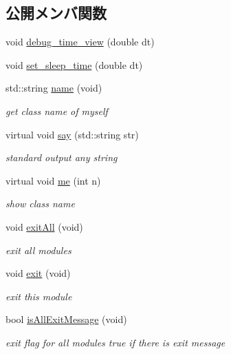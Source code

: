 \subsection*{公開メンバ関数}
\begin{DoxyCompactItemize}
\item 
void \hyperlink{classfractal_1_1Module_aa1799cce209611e46fafb8e826f4dc2e}{debug\+\_\+time\+\_\+view} (double dt)
\item 
void \hyperlink{classfractal_1_1Module_a4cd49e1c42043ea4254a8859992f5a64}{set\+\_\+sleep\+\_\+time} (double dt)
\item 
std\+::string \hyperlink{classfractal_1_1Module_a770fab9c6a6f310e76a9c29ed9c7d515}{name} (void)
\begin{DoxyCompactList}\small\item\em get class name of myself \end{DoxyCompactList}\item 
virtual void \hyperlink{classfractal_1_1Module_afd605b7a7ef55d5d0a55f520ff8feb86}{say} (std\+::string str)
\begin{DoxyCompactList}\small\item\em standard output any string \end{DoxyCompactList}\item 
virtual void \hyperlink{classfractal_1_1Module_a92deaafb88a2bc34958dca99fdc112a3}{me} (int n)
\begin{DoxyCompactList}\small\item\em show class name \end{DoxyCompactList}\item 
void \hyperlink{classfractal_1_1Module_a40cfc2e5ab9829d5decaef0ce30cdbcc}{exit\+All} (void)
\begin{DoxyCompactList}\small\item\em exit all modules \end{DoxyCompactList}\item 
void \hyperlink{classfractal_1_1Module_a04ba8c14e82f92c1db411662d7a16cd8}{exit} (void)
\begin{DoxyCompactList}\small\item\em exit this module \end{DoxyCompactList}\item 
bool \hyperlink{classfractal_1_1Module_a7766711ae2e854ee7a723781ef1b2572}{is\+All\+Exit\+Message} (void)
\begin{DoxyCompactList}\small\item\em exit flag for all modules  true if there is exit message \end{DoxyCompactList}\item 

\end{DoxyCompactItemize}
